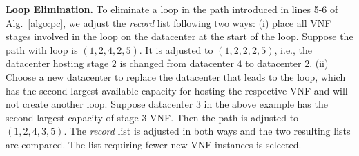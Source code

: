\vspace{1mm}
\noindent \textbf{Loop Elimination.}
To eliminate a loop in the path introduced in lines 5-6 of Alg.~\ref{algo:pc}, we adjust the {\em record} list following two ways: (i) place all VNF stages involved in the loop on the datacenter at the start of the loop. Suppose the path with loop is $(1, 2, 4, 2, 5)$. It is adjusted to $(1, 2, 2, 2, 5)$, i.e., the datacenter hosting stage $2$ is changed from datacenter $4$ to datacenter $2$. %
(ii) Choose a new datacenter to replace the datacenter that leads to the loop, which has the second largest available capacity for hosting the respective VNF and will not create another loop. Suppose datacenter $3$ in the above example has the second largest capacity of stage-$3$ VNF. Then the path is adjusted to %
 $(1, 2, 4, 3, 5)$. The {\em record} list is adjusted in both ways and the two resulting lists are compared. The list requiring fewer new VNF instances is selected.

